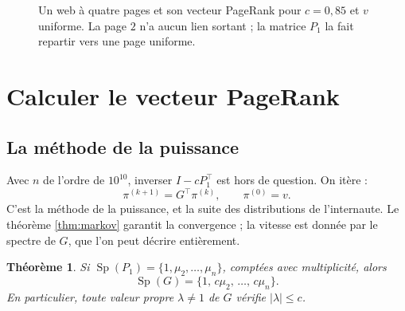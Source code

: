 \documentclass[11pt,a4paper]{article}
\theoremstyle{plain}
\newtheorem{theoreme}{Théorème}[section]
\theoremstyle{definition}
\theoremstyle{remark}
\DeclareMathOperator{\Sp}{Sp}
\begin{document}
\begin{figure}[h]
\centering
{}
\caption{Un web à quatre pages et son vecteur PageRank pour $c=0{,}85$ et $v$ uniforme. La page $2$ n'a aucun lien sortant ; la matrice $P_1$ la fait repartir vers une page uniforme.}\label{fig:quatre}
\end{figure}

\section{Calculer le vecteur PageRank}

\subsection{La méthode de la puissance}

Avec $n$ de l'ordre de $10^{10}$, inverser $I-cP_1^\top$ est hors de question. On itère :
\[
  \pi^{(k+1)}=G^\top\pi^{(k)},\qquad\pi^{(0)}=v .
\]
C'est la méthode de la puissance, et la suite des distributions de l'internaute. Le théorème \ref{thm:markov} garantit la convergence ; la vitesse est donnée par le spectre de $G$, que l'on peut décrire entièrement.

\begin{theoreme}\label{thm:spectre}
Si $\Sp(P_1)=\{1,\mu_2,\dots,\mu_n\}$, comptées avec multiplicité, alors
\[
  \Sp(G)=\{1,\,c\mu_2,\,\dots,\,c\mu_n\} .
\]
En particulier, toute valeur propre $\lambda\neq1$ de $G$ vérifie $|\lambda|\leq c$.
\end{theoreme}
\end{document}
